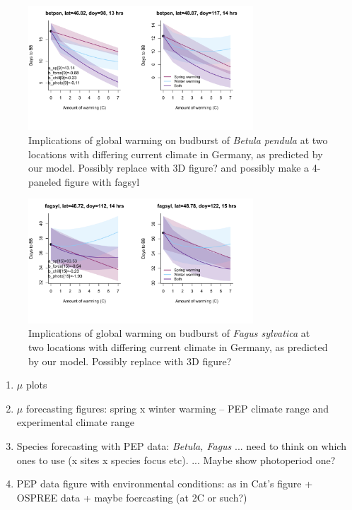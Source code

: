 \documentclass[11pt,letter]{article}
\begin{document}
\newpage

\begin{figure}[h!]
\centering
\noindent \includegraphics[width=0.75\textwidth]{..//..//analyses/bb_analysis/figures/tempforecast_betpen_minmaxlat_PEPBB_wdl.pdf}
\caption{Implications of global warming on budburst of \emph{Betula pendula} at two locations with differing current climate in Germany, as predicted by our model. Possibly replace with 3D figure? and possibly make a 4-paneled figure with fagsyl}
\label{fig:fore}
\end{figure}

\begin{figure}[h!]
\centering
\noindent \includegraphics[width=0.75\textwidth]{..//..//analyses/bb_analysis/figures/tempforecast_fagsyl_minmaxlat_PEPBB_wdl.pdf}
\caption{Implications of global warming on budburst of \emph{Fagus sylvatica} at two locations with differing current climate in Germany, as predicted by our model. Possibly replace with 3D figure?}
\label{fig:forefs}
\end{figure}

\newpage
\begin{enumerate}
\item $\mu$ plots


\item  $\mu$ forecasting figures: spring x winter warming -- PEP climate range and experimental climate range
\item Species forecasting with PEP data: \emph{Betula, Fagus} ... need to think on which ones to use (x sites x species focus etc). ... Maybe show photoperiod one?
\item PEP data figure with environmental conditions: as in Cat's figure + OSPREE data + maybe foercasting (at 2C or such?)
\end{enumerate}
\end{document}
